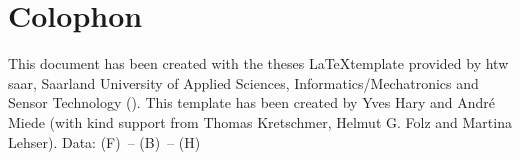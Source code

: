 \pagestyle{empty}

\hfill

\vfill


\section*{Colophon}

This document has been created with the theses \LaTeX template provided by htw saar, Saarland University of Applied Sciences, Informatics/Mechatronics and Sensor Technology (\currentVersion). This template has been created by Yves Hary and Andr\'e Miede (with kind support from Thomas Kretschmer, Helmut G. Folz and Martina Lehser). Data: (F)\makeatletter\f@size\makeatother\ -- (B)\the\textwidth\ -- (H)\the\textheight\
